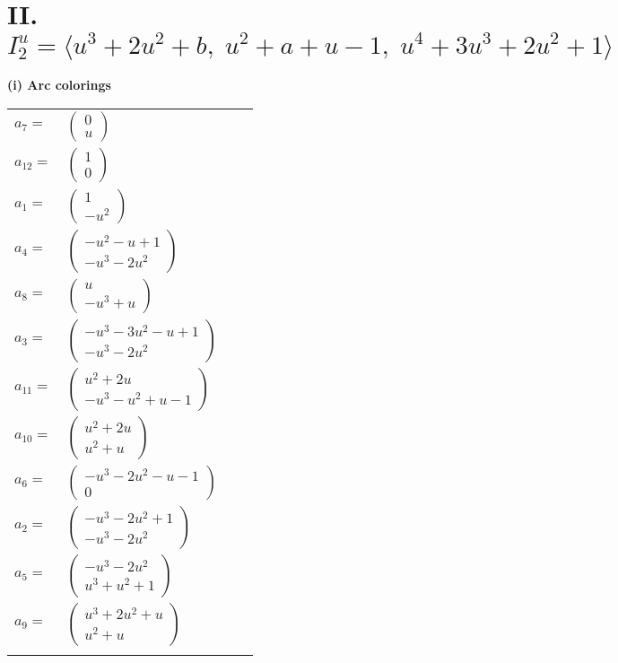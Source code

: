 \documentclass[1p]{elsarticle_modified}
\theoremstyle{definition}
\begin{document}
\centering \section*{II. $I^u_{2}= \langle u^3+2 u^2+b,\;u^2+a+u-1,\;u^4+3 u^3+2 u^2+1 \rangle$}
\flushleft \textbf{(i) Arc colorings}\\
\begin{tabular}{m{7pt} m{180pt} m{7pt} m{180pt} }
\flushright $a_{7}=$&$\begin{pmatrix}0\\u\end{pmatrix}$ \\
\flushright $a_{12}=$&$\begin{pmatrix}1\\0\end{pmatrix}$ \\
\flushright $a_{1}=$&$\begin{pmatrix}1\\- u^2\end{pmatrix}$ \\
\flushright $a_{4}=$&$\begin{pmatrix}- u^2- u+1\\- u^3-2 u^2\end{pmatrix}$ \\
\flushright $a_{8}=$&$\begin{pmatrix}u\\- u^3+u\end{pmatrix}$ \\
\flushright $a_{3}=$&$\begin{pmatrix}- u^3-3 u^2- u+1\\- u^3-2 u^2\end{pmatrix}$ \\
\flushright $a_{11}=$&$\begin{pmatrix}u^2+2 u\\- u^3- u^2+u-1\end{pmatrix}$ \\
\flushright $a_{10}=$&$\begin{pmatrix}u^2+2 u\\u^2+u\end{pmatrix}$ \\
\flushright $a_{6}=$&$\begin{pmatrix}- u^3-2 u^2- u-1\\0\end{pmatrix}$ \\
\flushright $a_{2}=$&$\begin{pmatrix}- u^3-2 u^2+1\\- u^3-2 u^2\end{pmatrix}$ \\
\flushright $a_{5}=$&$\begin{pmatrix}- u^3-2 u^2\\u^3+u^2+1\end{pmatrix}$ \\
\flushright $a_{9}=$&$\begin{pmatrix}u^3+2 u^2+u\\u^2+u\end{pmatrix}$\\&\end{tabular}
\end{document}
